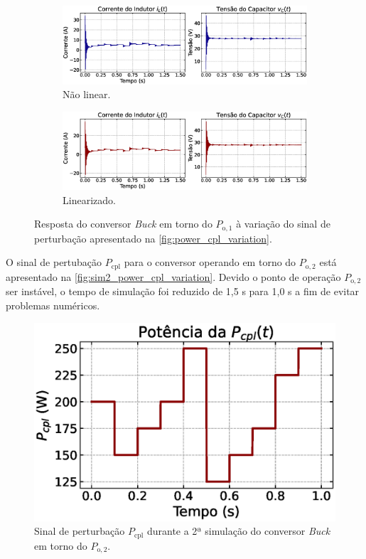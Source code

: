 \begin{figure}[H]
  \centering
  \captionsetup{justification=centering}
  \begin{subfigure}{1.\textwidth}
    \centering
    \includegraphics[width=1.\textwidth]{figuras/buck/sim2/op1/result_nonlinear.eps}
    \caption{Não linear.}
    \label{fig:simulation2_op1_nonlinear}
  \end{subfigure}
  \newline
  \begin{subfigure}{1.\textwidth}
    \centering
    \includegraphics[width=1.\textwidth]{figuras/buck/sim2/op1/result_linear.eps}
    \caption{Linearizado.}
    \label{fig:simulation2_op1_linear}
  \end{subfigure}
  \caption{Resposta do conversor \textit{Buck} em torno do $P_{\mathrm{o}, 1}$ à variação do sinal de perturbação apresentado na \autoref{fig:power_cpl_variation}.}
  \label{fig:simulation2_op1}
\end{figure}

O sinal de pertubação $P_{\mathrm{cpl}}$ para o conversor operando em torno do $P_{\mathrm{o}, 2}$ está apresentado na \autoref{fig:sim2_power_cpl_variation}. Devido o ponto de operação $P_{\mathrm{o}, 2}$ ser instável, o tempo de simulação foi reduzido de 1,5 s para 1,0 s a fim de evitar problemas numéricos.

\begin{figure}[H]
  \centering
  \captionsetup{justification=centering}
  \includegraphics[width=.5\textwidth]{figuras/buck/sim2/op2/power_cpl_variation.eps}
  \caption{Sinal de perturbação $P_{\mathrm{cpl}}$ durante a 2ª simulação do conversor \textit{Buck} em torno do $P_{\mathrm{o}, 2}$.}
  \label{fig:sim2_power_cpl_variation}
\end{figure}

